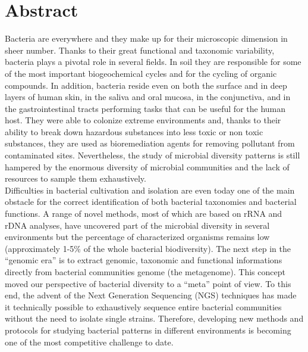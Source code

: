 \chapter{Abstract}

\small
Bacteria are everywhere and they make up for their microscopic dimension in sheer number. Thanks to their great functional and taxonomic variability, bacteria plays a pivotal role in several fields. In soil they are responsible for some of the most important biogeochemical cycles and for the cycling of organic compounds. In addition, bacteria reside even on both the surface and in deep layers of human skin, in the saliva and oral mucosa, in the conjunctiva, and in the gastrointestinal tracts performing tasks that can be useful for the human host. They were able to colonize extreme environments and, thanks to their ability to break down hazardous substances into less toxic or non toxic substances, they are used as bioremediation agents for removing pollutant from contaminated sites. Nevertheless, the study of microbial diversity patterns is still hampered by the enormous diversity of microbial communities and the lack of resources to sample them exhaustively.\\
Difficulties in bacterial cultivation and isolation are even today one of the main obstacle for the correct identification of both bacterial taxonomies and bacterial functions. A range of novel methods, most of which are based on rRNA and rDNA analyses, have uncovered part of the microbial diversity in several environments but the percentage of characterized organisms remains low (approximately 1-5\% of the whole bacterial biodiversity). The next step in the ``genomic era'' is to extract genomic, taxonomic and functional informations directly from bacterial communities genome (the metagenome). This concept moved our perspective of bacterial diversity to a ``meta'' point of view. To this end, the advent of the Next Generation Sequencing (NGS) techniques has made it technically possible to exhaustively sequence entire bacterial communities without the need to isolate single strains. Therefore, developing new methods and protocols for studying bacterial patterns in different environments is becoming one of the most competitive challenge to date.\\
